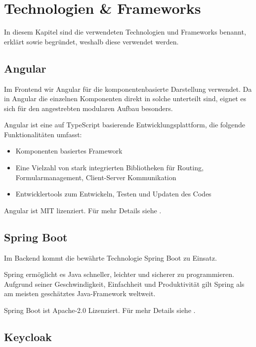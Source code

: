 \chapter{Technologien & Frameworks}\label{ch:technologien-&-frameworks}

In diesem Kapitel sind die verwendeten Technologien und Frameworks benannt, erklärt
sowie begründet, weshalb diese verwendet werden.

\section{Angular}\label{sec:angular}

Im Frontend wir Angular für die komponentenbasierte Darstellung verwendet.
Da in Angular die einzelnen Komponenten direkt in solche unterteilt sind,
eignet es sich für den angestrebten modularen Aufbau besonders.

Angular ist eine auf \gls{TypeScript} basierende Entwicklungsplattform, die folgende Funktionalitäten umfasst:
\begin{itemize}
    \item Komponenten basiertes Framework
    \item Eine Vielzahl von stark integrierten Bibliotheken für Routing, Formularmanagement, Client-Server Kommunikation
    \item Entwicklertools zum Entwickeln, Testen und Updaten des Codes
\end{itemize}
\cite{about-angular}

Angular ist MIT lizenziert.
Für mehr Details siehe .

\section{Spring Boot}\label{sec:spring-boot}

Im Backend kommt die bewährte Technologie Spring Boot zu Einsatz.

Spring ermöglicht es Java schneller, leichter und sicherer zu programmieren.
Aufgrund seiner Geschwindigkeit, Einfachheit und Produktivität gilt Spring als am meisten geschätztes Java-Framework weltweit.
\cite{about-springboot}

Spring Boot ist Apache-2.0 Lizenziert.
Für mehr Details siehe .

\section{Keycloak}\label{sec:keycloak}

